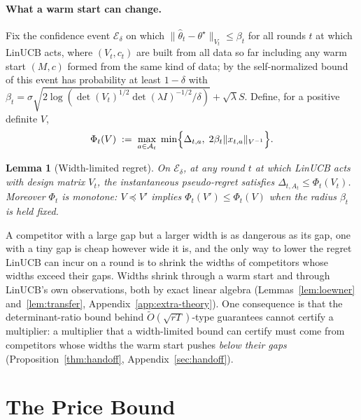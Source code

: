\documentclass{article}
\newtheorem{lemma}{Lemma}
\theoremstyle{definition}
\theoremstyle{remark}
\theoremstyle{remark}
\begin{document}
\paragraph{What a warm start can change.}
\label{sec:width}
Fix the confidence event $\mathcal E_\delta$ on which
$\|\widehat\theta_t-\theta^\star\|_{V_t}\le\beta_t$ for all rounds $t$ at
which LinUCB acts, where $(V_t,c_t)$ are built from all data so far including
any warm start $(M,c)$ formed from the same kind of data; by the
self-normalized bound of \cite{abbasi2011improved} this event has probability
at least $1-\delta$ with
$\beta_t=\sigma\sqrt{2\log(\det(V_t)^{1/2}\det(\lambda I)^{-1/2}/\delta)}+\sqrt\lambda S$.
Define, for a positive definite $V$,
\begin{equation}
\label{eq:phi}
\Phi_t(V)\;:=\;\max_{a\in\mathcal A_t}\;\min\Bigl\{\Delta_{t,a},\;2\beta_t\|x_{t,a}\|_{V^{-1}}\Bigr\}.
\end{equation}

\begin{lemma}[Width-limited regret]
\label{lem:width-limited}
On $\mathcal E_\delta$, at any round $t$ at which LinUCB acts with design
matrix $V_t$, the instantaneous pseudo-regret satisfies
$\Delta_{t,A_t}\le\Phi_t(V_t)$. Moreover $\Phi_t$ is monotone: $V\preceq V'$
implies $\Phi_t(V')\le\Phi_t(V)$ when the radius $\beta_t$ is held fixed.
\end{lemma}

A competitor with a large gap but a larger width is as dangerous as its gap,
one with a tiny gap is cheap however wide it is, and the only way to lower the
regret LinUCB can incur on a round is to shrink the widths of competitors
whose widths exceed their gaps. Widths shrink through a warm start and through
LinUCB's own observations, both by exact linear algebra
(Lemmas~\ref{lem:loewner} and~\ref{lem:transfer},
Appendix~\ref{app:extra-theory}). One consequence is that the
determinant-ratio bound behind $\widetilde O(\sqrt{rT})$-type guarantees
cannot certify a multiplier: a multiplier that a width-limited bound can
certify must come from competitors whose widths the warm start pushes
\emph{below their gaps}
(Proposition~\ref{thm:handoff}, Appendix~\ref{sec:handoff}).

\section{The Price Bound}
\label{sec:price}
\end{document}
